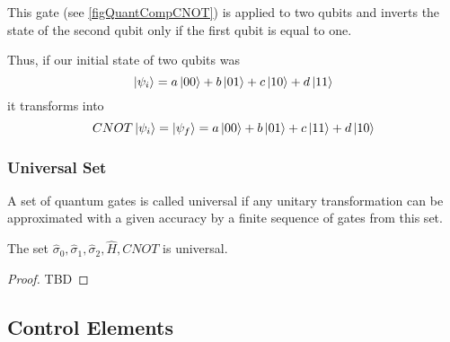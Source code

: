 This gate (see \autoref{figQuantCompCNOT}) is applied to two qubits and inverts the state of the second qubit only if the first qubit is equal to one.



Thus, if our initial state of two qubits was 
\[
\ket{\psi_i} = a \ket{00} + b \ket{01} + c \ket{10} + d \ket{11}
\]
it transforms into 
\[
CNOT \ket{\psi_i} = \ket{\psi_f} = 
a \ket{00} + b \ket{01} + c \ket{11} + d \ket{10}
\]

\subsubsection{Universal Set}

\begin{definition}
A set of quantum gates is called universal if any unitary transformation can be approximated with a given accuracy by a finite sequence of gates from this set.
\end{definition}

\begin{theorem}[Kitaev]
The set $\hat{\sigma}_0, \hat{\sigma}_1,
\hat{\sigma}_2, \hat{H}, CNOT$ is universal.
\begin{proof}
TBD
\end{proof}
\end{theorem}

\subsection{Control Elements}




